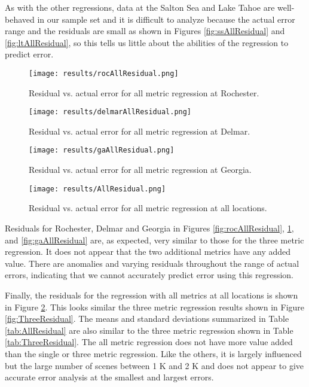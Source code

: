 \documentclass{book}
\begin{document}
As with the other regressions, data at the Salton Sea and Lake Tahoe are well-behaved in our sample set and it is difficult to analyze because the actual error range and the residuals are small as shown in Figures \ref{fig:ssAllResidual} and \ref{fig:ltAllResidual}, so this tells us little about the abilities of the regression to predict error.

\begin{figure}[H]
\begin{minipage}[b]{0.47\textwidth}
\centering
\texttt{[image: results/rocAllResidual.png]}
\caption{Residual vs. actual error for all metric regression at Rochester.}
\label{fig:rocAllResidual}
\end{minipage}
\begin{minipage}[b]{0.47\textwidth}
\centering
\texttt{[image: results/delmarAllResidual.png]}
\caption{Residual vs. actual error for all metric regression at Delmar.}
\label{fig:delmarAllResidual}
\end{minipage}
\end{figure}

\begin{figure}[H]
\begin{minipage}[b]{0.47\textwidth}
\centering
\texttt{[image: results/gaAllResidual.png]}
\caption{Residual vs. actual error for all metric regression at Georgia.}
\label{fig:gaAllResidual}
\end{minipage}
\begin{minipage}[b]{0.47\textwidth}
\centering
\texttt{[image: results/AllResidual.png]}
\caption{Residual vs. actual error for all metric regression at all locations.}
\label{fig:AllResidual}
\end{minipage}
\end{figure}

Residuals for Rochester, Delmar and Georgia in Figures \ref{fig:rocAllResidual}, \ref{fig:delmarAllResidual}, and \ref{fig:gaAllResidual} are, as expected, very similar to those for the three metric regression.  It does not appear that the two additional metrics have any added value.  There are anomalies and varying residuals throughout the range of actual errors, indicating that we cannot accurately predict error using this regression.

Finally, the residuals for the regression with all metrics at all locations is shown in Figure \ref{fig:AllResidual}.  This looks similar the three metric regression results shown in Figure \ref{fig:ThreeResidual}.  The means and standard deviations summarized in Table \ref{tab:AllResidual} are also similar to the three metric regression shown in Table \ref{tab:ThreeResidual}.  The all metric regression does not have more value added than the single or three metric regression.  Like the others, it is largely influenced but the large number of scenes between 1 K and 2 K and does not appear to give accurate error analysis at the smallest and largest errors.
\end{document}
